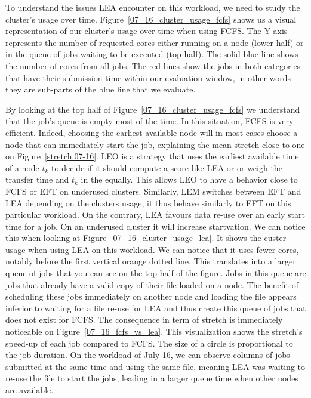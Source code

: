 \documentclass[conference,10pt]{IEEEtran}
\begin{document}
To understand the issues LEA encounter on this workload, we need to study the cluster's usage over time.
Figure~\ref{07_16_cluster_usage_fcfs} shows us a visual representation of 
our cluster's usage over time when using FCFS.
The Y axis represents the number of requested cores either running on a node (lower half) or in the queue of jobs waiting to be executed (top half).
The solid blue line shows the number of cores from all jobs.
The red lines show the jobs in both categories that have their submission
time within our evaluation window, in other words they are sub-parts of the blue line
that we evaluate.

By looking at the top half of Figure~\ref{07_16_cluster_usage_fcfs}
we understand that the job's queue is empty most of the time. In this situation, FCFS is very efficient. Indeed, choosing the earliest available node will in most cases choose a node that can immediately start the job, explaining the mean stretch close to one on Figure~\ref{stretch.07-16}.
LEO is a strategy that uses the earliest available time of a node $t_k$ to decide if it should compute a score like LEA or 
or weigh the transfer time and $t_k$ in the 
equally. This allows LEO to have a behavior close to FCFS or EFT on underused clusters.
Similarly, LEM switches between EFT and LEA depending on the clusters usage, it thus behave similarly to EFT on this particular workload.
On the contrary, LEA favours data re-use over an early start time for a job.
On an underused cluster it will increase startvation.
We can notice this when looking at
Figure~\ref{07_16_cluster_usage_lea}. It shows the custer usage when using LEA on this workload. We can notice that it uses fewer cores, notably before the first vertical orange dotted line. 
This translates into a larger queue of jobs that you can see on the top half of the figure. Jobs in this queue are jobs that already have a valid copy of their file loaded on a node. The benefit of scheduling 
these jobs immediately on another node and loading the file appears inferior to waiting for a file re-use for LEA and thus create this queue of jobs that does not exist for FCFS. 
The consequence in term of stretch is immediately noticeable on Figure~\ref{07_16_fcfs_vs_lea}. This visualization shows the stretch's speed-up of each job compared to FCFS. The size of a circle is proportional to the job duration. On the workload of July 16, we can observe columns of jobs submitted at the same time and using the same file, meaning LEA was waiting to re-use the file to start the jobs, leading in a larger queue time when other nodes are available.
\end{document}
